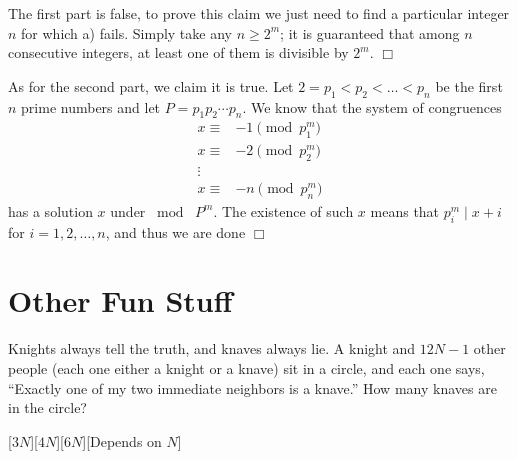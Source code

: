 \begin{solution}
    The first part is false, to prove this claim we just need to find a particular integer $n$ for which a) fails. Simply take any $n \geq 2^m$; it is guaranteed that among $n$ consecutive integers, at least one of them is divisible by $2^m$. $\Box$

    As for the second part, we claim it is true. Let $2= p_1< p_2< \ldots <p_n$ be the first $n$ prime numbers and let $P = p_1p_2 \cdots p_n$. We know that the system of congruences 
    \begin{align*}
        x \equiv& -1 \pmod{p_1^m} \\
        x \equiv& -2 \pmod{p_2^m} \\
        \vdots& \\
        x \equiv& -n \pmod{p_n^m}
    \end{align*}
    has a solution $x$ under $\bmod{ \hspace{4pt} P^m}$. The existence of such $x$ means that $p_i^m \mid x + i$ for $i=1,2, \ldots, n$, and thus we are done $\Box$ 
\end{solution}

\section{Other Fun Stuff}\setcounter{problem}{0}

\begin{problem}
     Knights always tell the truth, and knaves always lie. A knight and $12N - 1$ other people (each one either a knight or a knave) sit in a circle, and each one says, “Exactly one of my two immediate neighbors is a knave.” How many knaves are in the circle?
 \end{problem}
[$3N$][$4N$][$6N$][Depends on $N$]

